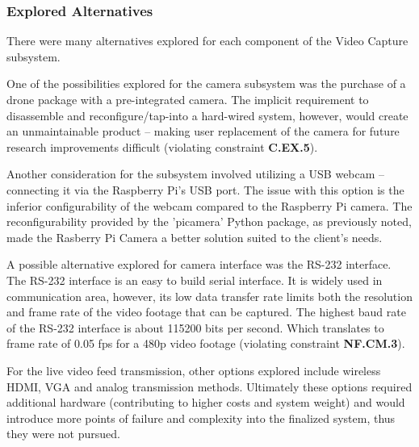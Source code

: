 \subsubsection{Explored Alternatives}
There were many alternatives explored for each component of the Video Capture subsystem.

One of the possibilities explored for the camera subsystem was the purchase of a drone package with a pre-integrated camera. The implicit requirement to disassemble and reconfigure/tap-into a hard-wired system, however, would create an unmaintainable product -- making user replacement of the camera for future research improvements difficult (violating constraint \textbf{C.EX.5}).

Another consideration for the subsystem involved utilizing a USB webcam -- connecting it via the Raspberry Pi's USB port. The issue with this option is the inferior configurability of the webcam compared to the Raspberry Pi camera. The reconfigurability provided by the 'picamera' Python package, as previously noted, made the Rasberry Pi Camera a better solution suited to the client's needs.

A possible alternative explored for camera interface was the RS-232 interface. The RS-232 interface is an easy to build serial interface. It is widely used in communication area, however, its low data transfer rate limits both the resolution and frame rate of the video footage that can be captured. The highest baud rate of the RS-232 interface is about 115200 bits per second. Which translates to frame rate of 0.05 fps for a 480p video footage (violating constraint \textbf{NF.CM.3}).

For the live video feed transmission, other options explored include wireless HDMI, VGA and analog transmission methods.  Ultimately these options required additional hardware (contributing to higher costs and system weight) and would introduce more points of failure and complexity into the finalized system, thus they were not pursued.
